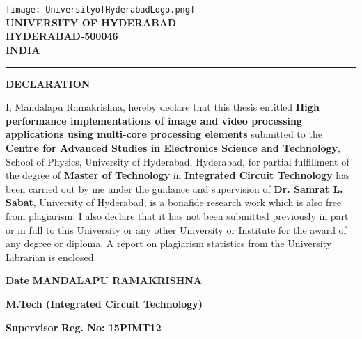 
\chapter*{}
\vspace{-5cm}
{\centering
\texttt{[image: UniversityofHyderabadLogo.png]}\\
\textbf{UNIVERSITY OF HYDERABAD}\\
\textbf{HYDERABAD-500046}\\
\textbf{INDIA}\\
\rule{\textwidth}{2pt}
\begin{center}
	\textbf{DECLARATION}
\end{center}}
I, Mandalapu Ramakrishna, hereby declare that this thesis entitled \textbf{High performance implementations of image and video processing applications using multi-core processing elements} submitted to the \textbf{Centre for Advanced Studies in Electronics Science and Technology}, School of Physics, University of Hyderabad, Hyderabad, for partial fulfillment of the degree of \textbf{Master of Technology} in \textbf{Integrated Circuit Technology} has been carried out by me under the guidance and supervision of \textbf{Dr. Samrat L. Sabat}, University of Hyderabad, is a bonafide research work which is also free from plagiarism. I also declare that it has not been submitted previously in part or in full to this University or any other University or Institute for the award of any degree or diploma. A report on plagiarism statistics from the University Librarian is enclosed. \\

\vspace{3.0cm}
\par
\textbf{Date }        \hspace{3.4cm}  \textbf{MANDALAPU RAMAKRISHNA}\par
                \hspace{4.7cm}  \textbf{M.Tech (Integrated Circuit Technology)}\par
\textbf{Supervisor}    \hspace{2.4cm}  \textbf{Reg. No: 15PIMT12}\par


